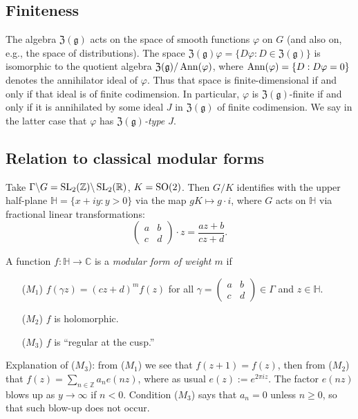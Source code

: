 \documentclass[reqno]{amsart} 
\begin{document}
\subsection{Finiteness}\label{sec:Z-g-finiteness}
The algebra $\mathfrak{Z}(\mathfrak{g})$ acts on the space of smooth functions $\varphi$ on $G$ (and also on, e.g., the space of distributions).  The space $\mathfrak{Z}(\mathfrak{g}) \varphi = \{D \varphi : D \in \mathfrak{Z}(\mathfrak{g})\}$ is isomorphic to the quotient algebra $\mathfrak{Z}(\mathfrak{g}) / \operatorname{Ann}(\varphi)$, where $\operatorname{Ann}(\varphi) = \{D : D \varphi = 0\}$ denotes the annihilator ideal of $\varphi$.  Thus that space is finite-dimensional if and only if that ideal is of finite codimension.  In particular, $\varphi$ is $\mathfrak{Z}(\mathfrak{g})$-finite if and only if it is annihilated by some ideal $J$ in $\mathfrak{Z}(\mathfrak{g})$ of finite codimension.  We say in the latter case that $\varphi$ has \emph{$\mathfrak{Z}(\mathfrak{g})$-type $J$}.

\subsection{Relation to classical modular forms}\label{sec:relat-class-modul}
Take $\Gamma \backslash G = \operatorname{SL}_2(\mathbb{Z}) \backslash \operatorname{SL}_2(\mathbb{R})$, $K = \operatorname{SO}(2)$.  Then $G/K$ identifies with the upper half-plane $\mathbb{H} = \{x + i y : y > 0\}$ via the map $g K \mapsto g \cdot i$, where $G$ acts on $\mathbb{H}$ via fractional linear transformations:
\begin{equation*}
  \begin{pmatrix}
    a & b \\
    c & d
  \end{pmatrix}
  \cdot z = \frac{a z + b }{c z + d}.
\end{equation*}
\begin{definition}\label{defn:function-f-:}
  A function $f : \mathbb{H} \rightarrow \mathbb{C}$ is a \emph{modular form of weight $m$} if
  \begin{enumerate}
  \item [($M_1$)] $f (\gamma z) = (c z + d) ^m f (z)$ for all $\gamma = 
    \begin{pmatrix}
      a & b \\
      c & d
    \end{pmatrix}
    \in \Gamma$ and $z \in \mathbb{H} $.
  \item [($M_2$)] $f$ is holomorphic.
  \item [($M_3$)] $f$ is ``regular at the cusp.''
  \end{enumerate}
\end{definition}
Explanation of ($M_3$): from ($M_1$) we see that $f(z+1) = f(z)$, then from ($M _2 $) that $f(z) = \sum _{n \in \mathbb{Z} } a_n e(n z)$, where as usual $e(z) := e^{2 \pi i z}$.  The factor $e (n z)$ blows up as $y \rightarrow \infty$ if $n < 0$.  Condition ($M_3$) says that $a_n = 0$ unless $n \geq 0$, so that such blow-up does not occur.
\end{document}
